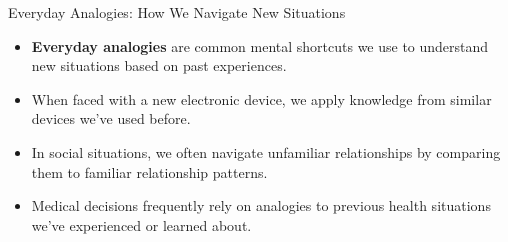 \documentclass{beamer}
\begin{document}
	\begin{frame}{Everyday Analogies: How We Navigate New Situations}
		\begin{itemize}
			\item \textbf{Everyday analogies} are common mental shortcuts we use to understand new situations based on past experiences.
			\item When faced with a new electronic device, we apply knowledge from similar devices we've used before.
			\item In social situations, we often navigate unfamiliar relationships by comparing them to familiar relationship patterns.
			\item Medical decisions frequently rely on analogies to previous health situations we've experienced or learned about.
		\end{itemize}
		
	\end{frame}
	
\end{document}
